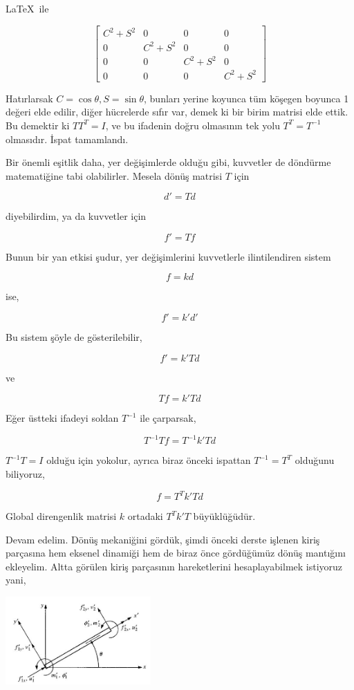 \documentclass[12pt,fleqn]{article}\usepackage{../../common}
\begin{document}
\LaTeX\ ile

$$
\left[\begin{matrix}C^{2} + S^{2} & 0 & 0 & 0\\0 & C^{2} + S^{2} & 0 & 0\\0 & 0 & C^{2} + S^{2} & 0\\0 & 0 & 0 & C^{2} + S^{2}\end{matrix}\right]
$$

Hatırlarsak $C = \cos\theta, S = \sin\theta$, bunları yerine koyunca tüm köşegen
boyunca 1 değeri elde edilir, diğer hücrelerde sıfır var, demek ki bir birim
matrisi elde ettik. Bu demektir ki $T T^T = I$, ve bu ifadenin doğru olmasının
tek yolu $T^T = T^{-1}$ olmasıdır. İspat tamamlandı.

Bir önemli eşitlik daha, yer değişimlerde olduğu gibi, kuvvetler de döndürme
matematiğine tabi olabilirler. Mesela dönüş matrisi $T$ için

$$
d' = T d
$$

diyebilirdim, ya da kuvvetler için

$$
f' = T f
$$

Bunun bir yan etkisi şudur, yer değişimlerini kuvvetlerle ilintilendiren
sistem

$$
f = k d
$$

ise,

$$
f' = k' d' 
$$

Bu sistem şöyle de gösterilebilir,

$$
f' = k' T d
$$

ve

$$
T f = k' T d
$$

Eğer üstteki ifadeyi soldan $T^{-1}$ ile çarparsak,

$$
T^{-1} T f = T^{-1} k' T d
$$

$T^{-1} T = I$ olduğu için yokolur, ayrıca biraz önceki ispattan $T^{-1} = T^T$
olduğunu biliyoruz,

$$
f = T^T k' T d
$$

Global direngenlik matrisi $k$ ortadaki $T^T k' T$ büyüklüğüdür.

Devam edelim. Dönüş mekaniğini gördük, şimdi önceki derste işlenen kiriş
parçasına hem eksenel dinamiği hem de biraz önce gördüğümüz dönüş mantığını
ekleyelim.  Altta görülen kiriş parçasının hareketlerini hesaplayabilmek
istiyoruz yani,

\includegraphics[width=15em]{phy_020_strs_06_02.jpg}
\end{document}
